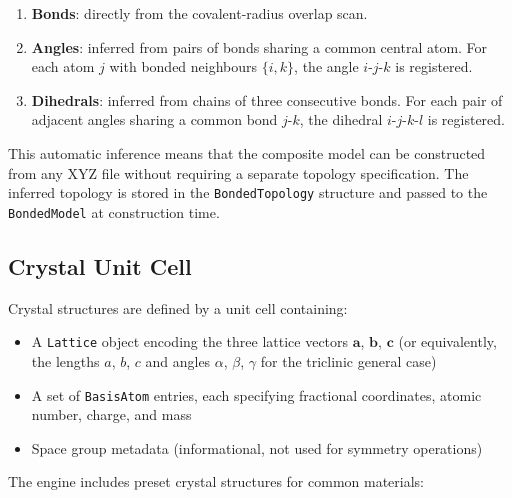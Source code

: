 \documentclass[11pt,twoside]{article}
\newcommand{\type}[1]{\texttt{#1}}
\begin{document}
\begin{enumerate}
  \item \textbf{Bonds}: directly from the covalent-radius overlap scan.
  \item \textbf{Angles}: inferred from pairs of bonds sharing a common central atom. For each atom $j$ with bonded neighbours $\{i, k\}$, the angle $i$-$j$-$k$ is registered.
  \item \textbf{Dihedrals}: inferred from chains of three consecutive bonds. For each pair of adjacent angles sharing a common bond $j$-$k$, the dihedral $i$-$j$-$k$-$l$ is registered.
\end{enumerate}

This automatic inference means that the composite model can be constructed from any XYZ file without requiring a separate topology specification. The inferred topology is stored in the \type{BondedTopology} structure and passed to the \type{BondedModel} at construction time.

\subsection{Crystal Unit Cell}

Crystal structures are defined by a unit cell containing:

\begin{itemize}
  \item A \type{Lattice} object encoding the three lattice vectors $\mathbf{a}$, $\mathbf{b}$, $\mathbf{c}$ (or equivalently, the lengths $a$, $b$, $c$ and angles $\alpha$, $\beta$, $\gamma$ for the triclinic general case)
  \item A set of \type{BasisAtom} entries, each specifying fractional coordinates, atomic number, charge, and mass
  \item Space group metadata (informational, not used for symmetry operations)
\end{itemize}

The engine includes preset crystal structures for common materials:
\end{document}
